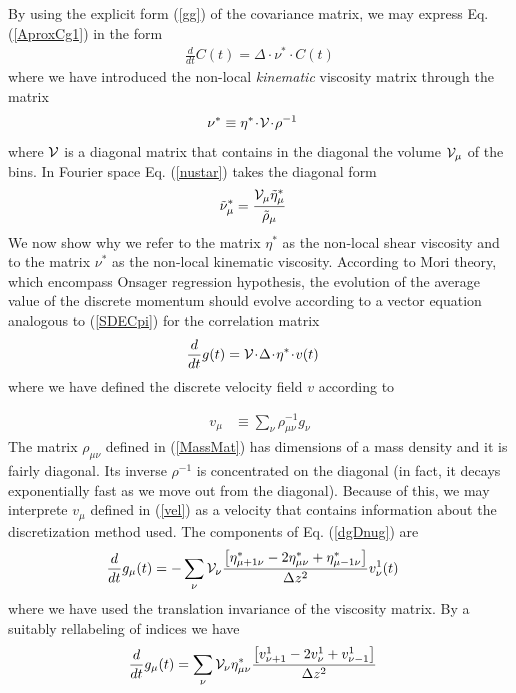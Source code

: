 \documentclass[a4paper,openright,12pt]{book}
\newcommand{\esc}{\!\cdot\!}
\begin{document}
By using the explicit form (\ref{gg}) of the covariance matrix, we may
express Eq. (\ref{AproxCg1}) in the form
\begin{align}
\frac{d}{dt}C(t)= \Delta\esc \nu^*\esc C(t)
\label{SDECpi}
\end{align}
where we  have introduced  the non-local  \textit{kinematic} viscosity
matrix through the matrix
\begin{align}
\nu^*&\equiv  \eta^*\esc{\cal V}\esc \rho^{-1}
\label{nustar}
\end{align}
where ${\cal  V}$ is a diagonal  matrix that contains in  the diagonal
the volume ${\cal  V}_\mu$ of the bins.   In Fourier space Eq. (\ref{nustar})
takes the diagonal form
\begin{align}
  \tilde{\nu}_\mu^*&=  \frac{{\cal V}_\mu \tilde{\eta}_\mu^*}{\tilde{\rho}_\mu}
\end{align}
We now show why we refer to the matrix $\eta^*$ as the non-local shear
viscosity  and  to  the  matrix $\nu^*$  as  the  non-local  kinematic
viscosity.   According   to  Mori  theory,  which   encompass  Onsager
regression  hypothesis, the  evolution  of the  average  value of  the
discrete momentum should evolve according to a vector equation analogous to
(\ref{SDECpi}) for the correlation matrix
\begin{align}
  \frac{d}{dt}g(t)&={\cal V}\esc \Delta\esc\eta^*\esc v(t)
\label{dgDnug}
\end{align}
where we have defined the discrete velocity field $v$ according to

\begin{align}
  v_\mu&\equiv\sum_\nu \rho_{\mu\nu}^{-1}g_\nu
\label{vel}
\end{align}
The matrix  $\rho_{\mu\nu}$ defined in (\ref{MassMat})  has dimensions
of a mass density and it  is fairly diagonal.  Its inverse $\rho^{-1}$
is concentrated on the diagonal (in fact, it decays exponentially fast
as we move out from the diagonal).  Because of this, we may interprete
$v_\mu$ defined in (\ref{vel}) as a velocity that contains information
about   the   discretization   method   used.    The components of
Eq. (\ref{dgDnug}) are
\begin{align}
  \frac{d}{dt}{g}_\mu(t)&=
-\sum_\nu{\cal V}_\nu 
\frac{\left[
\eta^*_{\mu+1\nu}-2\eta^*_{\mu\nu}+\eta^*_{\mu-1\nu}\right]}{\Delta z^2}{v}_\nu^1(t)
\end{align}
where we have used the translation invariance of the viscosity matrix.
By a suitably rellabeling  of indices we have
\begin{align}
  \frac{d}{dt}{g}_\mu(t)&=\sum_\nu{\cal V}_\nu \eta^*_{\mu\nu}
\frac{\left[{v}_{\nu+1}^1-2{v}_{\nu}^1+{v}_{\nu-1}^1\right]}{\Delta z^2}
\label{SDELap0} 
\end{align}
\end{document}
